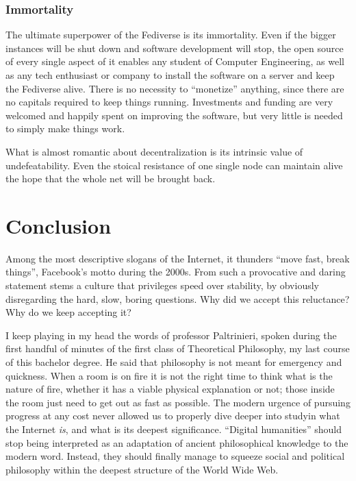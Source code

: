 \documentclass[
  a4paper,
]{book}
\begin{document}
\hypertarget{immortality}{%
\subsection{Immortality}\label{immortality}}

The ultimate superpower of the Fediverse is its immortality. Even if the bigger instances will be shut down and software development will stop, the open source of every single aspect of it enables any student of Computer Engineering, as well as any tech enthusiast or company to install the software on a server and keep the Fediverse alive. There is no necessity to ``monetize'' anything, since there are no capitals required to keep things running. Investments and funding are very welcomed and happily spent on improving the software, but very little is needed to simply make things work.

What is almost romantic about decentralization is its intrinsic value of undefeatability. Even the stoical resistance of one single node can maintain alive the hope that the whole net will be brought back.

\hypertarget{conclusion}{%
\chapter{Conclusion}\label{conclusion}}

Among the most descriptive slogans of the Internet, it thunders ``move fast, break things'', Facebook's motto during the 2000s. From such a provocative and daring statement stems a culture that privileges speed over stability, by obviously disregarding the hard, slow, boring questions. Why did we accept this reluctance? Why do we keep accepting it?

I keep playing in my head the words of professor Paltrinieri, spoken during the first handful of minutes of the first class of Theoretical Philosophy, my last course of this bachelor degree. He said that philosophy is not meant for emergency and quickness. When a room is on fire it is not the right time to think what is the nature of fire, whether it has a viable physical explanation or not; those inside the room just need to get out as fast as possible. The modern urgence of pursuing progress at any cost never allowed us to properly dive deeper into studyin what the Internet \emph{is}, and what is its deepest significance. ``Digital humanities'' should stop being interpreted as an adaptation of ancient philosophical knowledge to the modern word. Instead, they should finally manage to squeeze social and political philosophy within the deepest structure of the World Wide Web.
\end{document}
